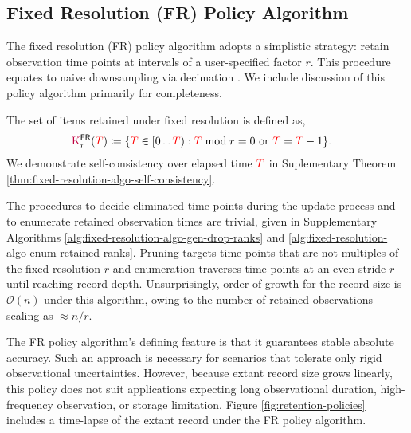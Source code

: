 \subsection{Fixed Resolution (FR) Policy Algorithm}
\label{sec:fixed-resolution-algo}

The fixed resolution (FR) policy algorithm adopts a simplistic strategy: retain observation time points at intervals of a user-specified factor $r$.
This procedure equates to naive downsampling via decimation \citep[p. 31]{crochiere1983multirate}.
We include discussion of this policy algorithm primarily for completeness.

The set of items retained under fixed resolution is defined as,
\begin{align}
\colorK^{\mathsf{FR}}_r(\colorT)
&\coloneq \{
\colorTbar \in [0\twodots\colorT)
: \colorTbar \bmod r = 0 \text{ or } \colorTbar = \colorT - 1
\}.
\label{eqn:fr_kept}
\end{align}
We demonstrate self-consistency over elapsed time $\colorT$ in Suplementary Theorem \ref{thm:fixed-resolution-algo-self-consistency}.

The procedures to decide eliminated time points during the update process and to enumerate retained observation times are trivial, given in Supplementary Algorithms \ref{alg:fixed-resolution-algo-gen-drop-ranks} and \ref{alg:fixed-resolution-algo-enum-retained-ranks}.
Pruning targets time points that are not multiples of the fixed resolution $r$ and enumeration traverses time points at an even stride $r$ until reaching record depth.
Unsurprisingly, order of growth for the record size is $\mathcal{O}(n)$ under this algorithm, owing to the number of retained observations scaling as $\approx n / r$.




% 
% 

The FR policy algorithm's defining feature is that it guarantees stable absolute accuracy.
Such an approach is necessary for scenarios that tolerate only rigid observational uncertainties.
However, because extant record size grows linearly, this policy does not suit applications expecting long observational duration, high-frequency observation, or storage limitation.
Figure \ref{fig:retention-policies} includes a time-lapse of the extant record under the FR policy algorithm.
